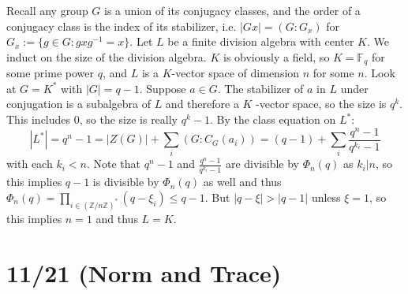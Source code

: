 \documentclass[11pt, oneside]{amsart}   	%
\theoremstyle{definition}
\begin{document}
\begin{itemize}
	Recall any group $G$ is a union of its conjugacy classes, and the order of a conjugacy class is the index of its stabilizer, i.e. $|Gx| = (G : G_x)$ for 
	$G_x := \{g\in G : gxg^{-1} = x\}$. Let $L$ be a finite division algebra with center $K$. We induct on the size of the division algebra. 
	$K$ is obviously a field, so $K = \mathbb F_q$ for some prime power $q$, and $L$ is a $K$-vector space of dimension $n$ for some $n$. 
	Look at $G = K^*$ with $|G| = q - 1$. Suppose $a\in G$. The stabilizer of $a$ in $L$ under conjugation is a subalgebra of $L$ and therefore a $K$
	-vector space, so the size is $q^k$. This includes $0$, so the size is really $q^k - 1$. By the class equation on $L^*$: 
	$$
		|L^*| = q^n - 1 = |Z(G)| + \sum_i(G : C_G(a_i)) = (q - 1) + \sum_i\frac{q^n - 1}{q^{k_i} - 1}
	$$
	with each $k_i < n$. Note that $q^n - 1$ and $\frac{q^n - 1}{q^{k_i} - 1}$ are divisible by $\Phi_n(q)$ as $k_i | n$, so this implies $q - 1$ is divisible 
	by $\Phi_n(q)$ as well and thus $\Phi_n(q) = \prod_{i\in(\mathbb Z / n\mathbb Z)^*}(q - \xi_i) \leq q - 1$. But $|q - \xi | > |q - 1|$ unless $\xi = 1$, so this 
	implies $n = 1$ and thus $L = K$.

\end{itemize}

\section{11/21 (Norm and Trace)}
\end{document}
